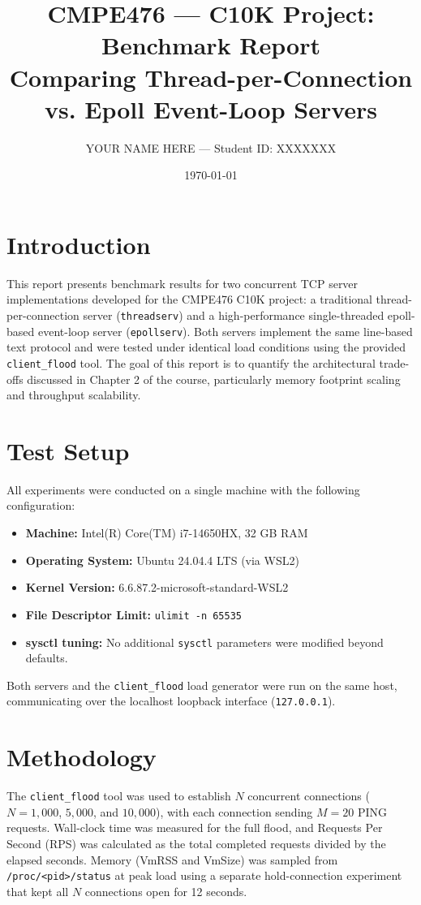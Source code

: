 \documentclass[11pt,a4paper]{article}
\title{CMPE476 --- C10K Project: Benchmark Report\\
\large Comparing Thread-per-Connection vs. Epoll Event-Loop Servers}
\author{YOUR NAME HERE --- Student ID: XXXXXXX}
\date{\today}
\begin{document}
\maketitle

\section{Introduction}
This report presents benchmark results for two concurrent TCP server implementations developed for the CMPE476 C10K project: a traditional thread-per-connection server (\texttt{threadserv}) and a high-performance single-threaded epoll-based event-loop server (\texttt{epollserv}). Both servers implement the same line-based text protocol and were tested under identical load conditions using the provided \texttt{client\_flood} tool. The goal of this report is to quantify the architectural trade-offs discussed in Chapter 2 of the course, particularly memory footprint scaling and throughput scalability.

\section{Test Setup}
All experiments were conducted on a single machine with the following configuration:
\begin{itemize}
    \item \textbf{Machine:} Intel(R) Core(TM) i7-14650HX, 32 GB RAM
    \item \textbf{Operating System:} Ubuntu 24.04.4 LTS (via WSL2)
    \item \textbf{Kernel Version:} 6.6.87.2-microsoft-standard-WSL2
    \item \textbf{File Descriptor Limit:} \texttt{ulimit -n 65535}
    \item \textbf{sysctl tuning:} No additional \texttt{sysctl} parameters were modified beyond defaults.
\end{itemize}
Both servers and the \texttt{client\_flood} load generator were run on the same host, communicating over the localhost loopback interface (\texttt{127.0.0.1}).

\section{Methodology}
The \texttt{client\_flood} tool was used to establish $N$ concurrent connections ($N = 1{,}000$, $5{,}000$, and $10{,}000$), with each connection sending $M=20$ PING requests. Wall-clock time was measured for the full flood, and Requests Per Second (RPS) was calculated as the total completed requests divided by the elapsed seconds. Memory (VmRSS and VmSize) was sampled from \texttt{/proc/<pid>/status} at peak load using a separate hold-connection experiment that kept all $N$ connections open for 12 seconds.
\end{document}
